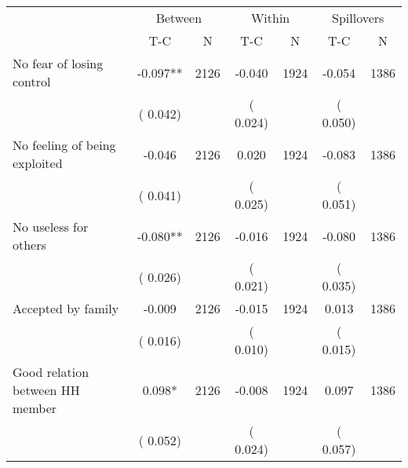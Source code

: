 
\begin{tabular}{l*{6}{c}}\hline&\multicolumn{2}{c}{Between}&\multicolumn{2}{c}{Within}&\multicolumn{2}{c}{Spillovers} \\ \cmidrule(r){2-3}\cmidrule(l){4-5}\cmidrule(l){6-7} & {T-C} & {N} & {T-C} & {N}  & {T-C}  & {N}  \\ \midrule
No fear of losing control        &             -0.097**      &       2126       &             -0.040      &       1924       &             -0.054      &       1386       \\
                       &       (       0.042)            &                               &       (       0.024)            &                               &       (       0.050)            &                               \\
No feeling of being exploited        &             -0.046      &       2126       &              0.020      &       1924       &             -0.083      &       1386       \\
                       &       (       0.041)            &                               &       (       0.025)            &                               &       (       0.051)            &                               \\
No useless for others        &             -0.080**      &       2126       &             -0.016      &       1924       &             -0.080      &       1386       \\
                       &       (       0.026)            &                               &       (       0.021)            &                               &       (       0.035)            &                               \\
Accepted by family        &             -0.009      &       2126       &             -0.015      &       1924       &              0.013      &       1386       \\
                       &       (       0.016)            &                               &       (       0.010)            &                               &       (       0.015)            &                               \\
Good relation between HH member        &              0.098*      &       2126       &             -0.008      &       1924       &              0.097      &       1386       \\
                       &       (       0.052)            &                               &       (       0.024)            &                               &       (       0.057)            &                               \\

\end{tabular}
